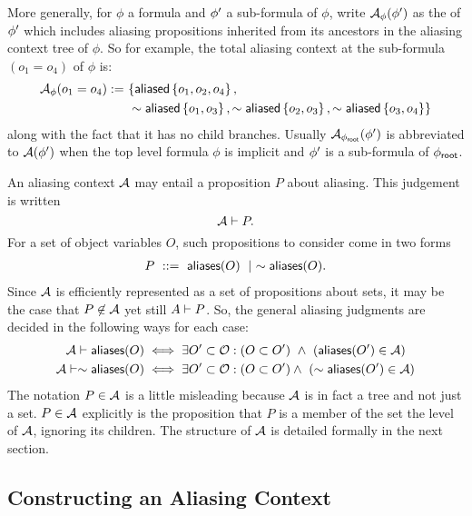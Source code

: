 %
More generally, for $\phi$ a formula and $\phi^\prime$ a sub-formula of $\phi$, write $\mathcal{A}_\phi(\phi^\prime)$ as the  of $\phi^\prime$ which includes aliasing propositions inherited from its ancestors in the aliasing context tree of $\phi$.
So for example, the total aliasing context at the sub-formula $(o_1 = o_4)$ of $\phi$ is:
\begin{align*}
  \mathcal{A}_\phi(o_1 = o_4) := & \
  \{
    \textsf{aliased}\left\{ o_1, o_2, o_4 \right\}, \\ & \
    \sim \textsf{aliased}\left\{ o_1, o_3 \right\},
    \sim \textsf{aliased}\left\{ o_2, o_3 \right\},
    \sim \textsf{aliased}\left\{ o_3, o_4 \right\}
  \}
\end{align*}
along with the fact that it has no child branches.
Usually $\mathcal{A}_{\phi_\textsf{root}}(\phi^\prime)$ is abbreviated to $\mathcal{A}(\phi^\prime)$ when the top level formula $\phi$ is implicit and $\phi^\prime$ is a sub-formula of ${\phi_\textsf{root}}$.

An aliasing context $\mathcal{A}$ may entail a proposition $P$ about aliasing. This judgement is written
$$
\mathcal{A} \vdash P.
$$
For a set of object variables $O$, such propositions to consider come in two forms
\begin{align*}
P \ ::= \ \textsf{aliases}(O) \ \mid \ \sim \textsf{aliases}(O).
\end{align*}
Since $\mathcal{A}$ is efficiently represented as a set of propositions about sets, it may be the case that $P \not\in \mathcal{A}$ yet still $A \vdash P$.
So, the general aliasing judgments are decided in the following ways for each case:
\begin{align*}
\mathcal{A} \vdash \textsf{aliases}(O)
&\iff
\exists O^\prime \subset \mathcal{O} : (O \subset O^\prime) \ \land \ (\textsf{aliases}(O^\prime) \in \mathcal{A})
\\
\mathcal{A} \vdash \sim \textsf{aliases}(O)
&\iff
\exists O^\prime \subset \mathcal{O} : (O \subset O^\prime) \land \ (\sim \textsf{aliases}(O^\prime) \in \mathcal{A})
\end{align*}
The notation $P \in \mathcal{A}$ is a little misleading because $\mathcal{A}$ is in fact a tree and not just a set. $P \in \mathcal{A}$ explicitly is the proposition that $P$ is a member of the set  the level of $\mathcal{A}$, ignoring its children. The structure of $\mathcal{A}$ is detailed formally in the next section.

\subsection{Constructing an Aliasing Context}

